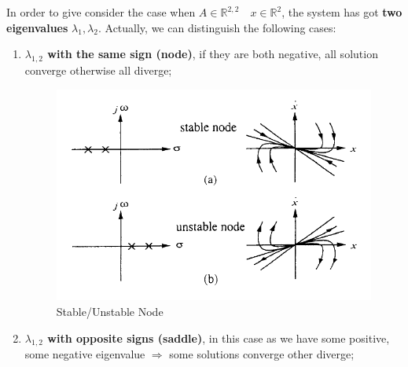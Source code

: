 In order to give consider the case when $A\in \mathbb{R}^{2,2} \quad x \in \mathbb{R}^2$, the system has got \textbf{two eigenvalues} $\lambda_1, \lambda_2$. Actually, we can distinguish the following cases:
\begin{enumerate}
    \item \textbf{$\lambda_{1, 2}$ with the same sign (node)}, if they are both negative, all solution converge otherwise all diverge; 
    \begin{figure}[h]
        \centering
        \includegraphics[scale=0.8]{NonLinearControl/images/node.png}
        \caption{Stable/Unstable Node }
        \label{fig:enter-label}
    \end{figure}
    
    \item \textbf{$\lambda_{1, 2}$ with opposite signs (saddle)}, in this case as we have some positive, some negative eigenvalue $\Rightarrow$ some solutions converge other diverge; 
    

\end{enumerate}
